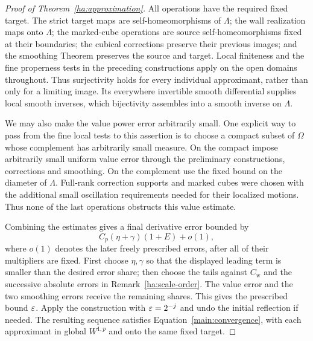 \begin{proof}[Proof of Theorem~\ref{ha:approximation}]
All operations have the required fixed target.  The strict target
maps are self-homeomorphisms of $\Lambda$; the wall realization
maps onto $\Lambda$; the marked-cube operations are source
self-homeomorphisms fixed at their boundaries; the cubical
corrections preserve their previous images; and the smoothing
Theorem preserves the source and target.  Local finiteness and the
fine properness tests in the preceding constructions apply on the
open domains throughout.
Thus surjectivity holds for every individual approximant, rather
than only for a limiting image.  Its everywhere invertible smooth
differential supplies local smooth inverses, which bijectivity
assembles into a smooth inverse on $\Lambda$.

We may also make the value power error arbitrarily small.  One
explicit way to pass from the fine local tests to this assertion is
to choose a compact subset of $\Omega$ whose complement has
arbitrarily small measure.  On the compact impose arbitrarily small
uniform value error through the preliminary constructions,
corrections and smoothing.  On the complement use the fixed bound
on the diameter of $\Lambda$.  Full-rank correction supports and
marked cubes were chosen with the additional small oscillation
requirements needed for their localized motions.  Thus none of the
last operations obstructs this value estimate.

Combining the estimates gives a final derivative error bounded by
\[
                    C_p(\eta+\gamma)(1+E)+o(1),
\]
where $o(1)$ denotes the later freely prescribed errors, after all
of their multipliers are fixed.  First choose $\eta,\gamma$ so that
the displayed leading term is smaller than the desired error share;
then choose the tails against $C_{\mathrm w}$ and the successive
absolute errors in Remark~\ref{ha:scale-order}.  The value error
and the two smoothing errors receive the remaining shares.  This
gives the prescribed bound $\varepsilon$.  Apply the construction with
$\varepsilon=2^{-j}$ and undo the initial reflection if needed.
The resulting sequence satisfies Equation~\eqref{main:convergence},
with each approximant in global $W^{1,p}$ and onto the same fixed target.
\end{proof}
